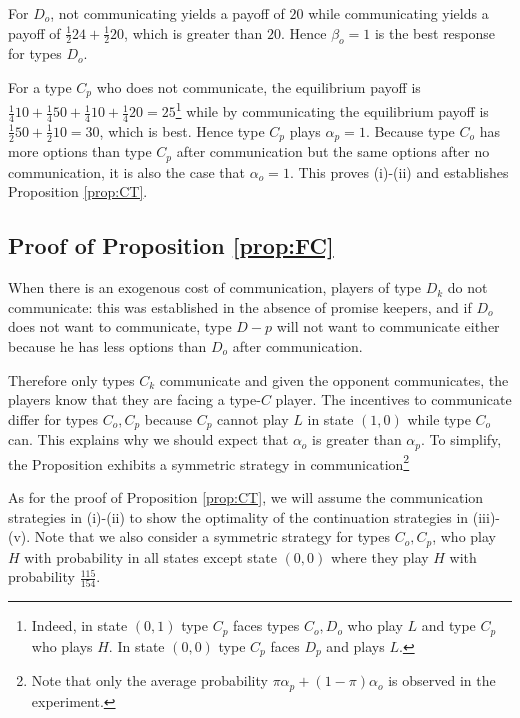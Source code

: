\documentclass[12pt]{article}
\theoremstyle{break}
\begin{document}
For $D_o$, not communicating yields a payoff of $20$ while communicating yields a payoff of $\frac{1}{2}24+\frac{1}{2}20$, which is greater than $20$. Hence $\beta_o=1$ is the best response for types $D_o$.

For a type $C_p$ who does not communicate, the equilibrium payoff is $ \frac{1}{4}10+\frac{1}{4}50+\frac{1}{4}10+\frac{1}{4}20=25$\footnote{
Indeed, in state $(0,1)$ type $C_p$ faces types $C_o,D_o$ who play $L$	and type $C_p$ who plays $H$. In state $(0,0)$ type $C_p$ faces $D_p$ and plays $L$.
} while by communicating the equilibrium payoff is $\frac{1}{2}50+\frac{1}{2}10=30$, which is best. Hence type $C_p$ plays $\alpha_p=1$. Because type $C_o$ has more options than type $C_p$ after communication but the same options after no communication, it is also the case that $\alpha_o=1$. This proves (i)-(ii) and establishes Proposition \ref{prop:CT}.



%
%
%   
%    

\subsection*{Proof of Proposition \ref{prop:FC}}
When there is an exogenous cost of communication, players of type $D_k$ do not communicate: this was established in the absence of promise keepers, and if $D_o$ does not want to communicate, type $D-p$ will not want to communicate either because he has less options than $D_o$ after communication. 

Therefore only types $C_k$ communicate and given the opponent communicates, the players know that they are facing a type-$C$ player. The incentives to communicate differ for types $C_o,C_p$ because $C_p$ cannot play $L$ in state $(1,0)$ while type $C_o$ can. This explains why we should expect that $\alpha_o$ is greater than $\alpha_p$. To simplify, the Proposition exhibits a symmetric strategy in communication\footnote{Note that only the average probability $\pi\alpha_p+(1-\pi)\alpha_o$ is observed in the experiment.
}

As for the proof of Proposition \ref{prop:CT}, we will assume the communication strategies in (i)-(ii) to show the optimality of the continuation strategies in (iii)-(v). Note that we also consider a symmetric strategy for types $C_o,C_p$, who play $H$ with probability in all states except state $(0,0)$ where they play $H$ with probability $\frac{115}{154}$.
\end{document}
